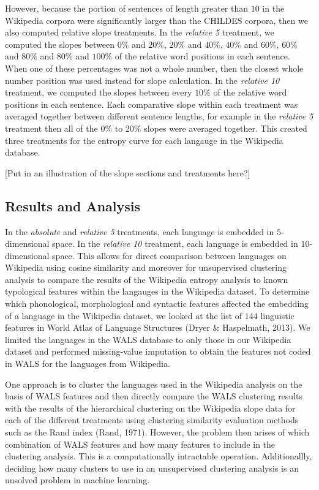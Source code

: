 \documentclass[10pt, letterpaper]{article}
\begin{document}
However, because the portion of sentences of length greater than \(10\)
in the Wikipedia corpora were significantly larger than the CHILDES
corpora, then we also computed relative slope treatments. In the
\emph{relative 5} treatment, we computed the slopes between \(0\%\) and
\(20\%\), \(20\%\) and \(40\%\), \(40\%\) and \(60\%\), \(60\%\) and
\(80\%\) and \(80\%\) and \(100\%\) of the relative word positions in
each sentence. When one of these percentages was not a whole number,
then the closest whole number position was used instead for slope
calculation. In the \emph{relative 10} treatment, we computed the slopes
between every \(10\%\) of the relative word positions in each sentence.
Each comparative slope within each treatment was averaged together
between different sentence lengths, for example in the \emph{relative 5}
treatment then all of the \(0\%\) to \(20\%\) slopes were averaged
together. This created three treatments for the entropy curve for each
langauge in the Wikipedia database.

{[}Put in an illustration of the slope sections and treatments here?{]}

\subsection{Results and Analysis}\label{results-and-analysis}

In the \emph{absolute} and \emph{relative 5} treatments, each language
is embedded in \(5\)-dimensional space. In the \emph{relative 10}
treatment, each language is embedded in \(10\)-dimensional space. This
allows for direct comparison between languages on Wikipedia using cosine
similarity and moreover for unsupervised clustering analysis to compare
the results of the Wikipedia entropy analysis to known typological
features within the langauges in the Wikipedia dataset. To determine
which phonological, morphological and syntactic features affected the
embedding of a language in the Wikipedia dataset, we looked at the list
of \(144\) linguistic features in World Atlas of Language Structures
(Dryer \& Haspelmath, 2013). We limited the languages in the WALS
database to only those in our Wikipedia dataset and performed
missing-value imputation to obtain the features not coded in WALS for
the languages from Wikipedia.

One approach is to cluster the languages used in the Wikipedia analysis
on the basis of WALS features and then directly compare the WALS
clustering results with the results of the hierarchical clustering on
the Wikipedia slope data for each of the different treatments using
clustering similarity evaluation methods such as the Rand index (Rand,
1971). However, the problem then arises of which combination of WALS
features and how many features to include in the clustering analysis.
This is a computationally intractable operation. Additionallly, deciding
how many clusters to use in an unsupervised clustering analysis is an
unsolved problem in machine learning.
\end{document}
